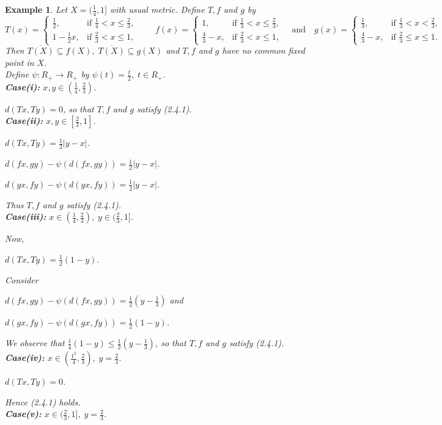 \documentclass[11]{article}
\newtheorem{example}[definition]{Example}
\numberwithin{equation}{definition}
\begin{document}
\begin{example}
Let $X=(\frac{1}{4},1]$ with usual metric. Define $T,f$ and $g$ by
\[
T(x)=
\begin{cases}
\frac{1}{2}, & \text{if } \frac{1}{4}<x\le \frac{2}{3},\\
1-\frac{1}{2}x, & \text{if } \frac{2}{3}<x\le 1,
\end{cases}
\qquad
f(x)=
\begin{cases}
1, & \text{if } \frac{1}{3}<x\le \frac{2}{3},\\
\frac{4}{3}-x, & \text{if } \frac{2}{3}<x\le 1,
\end{cases}
\quad \text{and} \quad
g(x)=
\begin{cases}
\frac{1}{3}, & \text{if } \frac{1}{3}<x<\frac{2}{3},\\
\frac{4}{3}-x, & \text{if } \frac{2}{3}\le x\le 1.
\end{cases}
\]
Then $\overline{T(X)}\subseteq f(X),\;\overline{T(X)}\subseteq g(X)$ and $T,f$ and $g$ have no common fixed point in $X$.\\
Define $\psi:R_{+}\to R_{+}$ by $\psi(t)=\frac{t}{2},\;t\in R_{+}$.\\
\textbf{Case(i):} $x,y\in(\frac{1}{4},\frac{2}{3})$.

$d(Tx,Ty)=0$, so that $T,f$ and $g$ satisfy (2.4.1).\\
\textbf{Case(ii):} $x,y\in[\frac{2}{3},1]$.

$d(Tx,Ty)=\frac{1}{2}|y-x|$.

$d(fx,gy)-\psi(d(fx,gy))=\frac{1}{2}|y-x|$.

$d(gx,fy)-\psi(d(gx,fy))=\frac{1}{2}|y-x|$.

Thus $T,f$ and $g$ satisfy (2.4.1).\\
\textbf{Case(iii):} $x\in(\frac{1}{4},\frac{2}{3}),\;y\in(\frac{2}{3},1]$.

Now,

$d(Tx,Ty)=\frac{1}{2}(1-y)$.

Consider

$d(fx,gy)-\psi(d(fx,gy))=\frac{1}{2}(y-\frac{1}{3})$ and

$d(gx,fy)-\psi(d(gx,fy))=\frac{1}{2}(1-y)$.

We observe that $\frac{1}{4}(1-y)\leq\frac{1}{2}(y-\frac{1}{3})$, so that $T,f$ and $g$ satisfy (2.4.1).\\
\textbf{Case(iv):} $x\in(\frac{1^{2}}{4},\frac{2}{3}),\;y=\frac{2}{3}$.

$d(Tx,Ty)=0$.

Hence (2.4.1) holds.\\
\textbf{Case(v):} $x\in(\frac{2}{3},1],\;y=\frac{2}{3}$.


\end{example}
\end{document}
